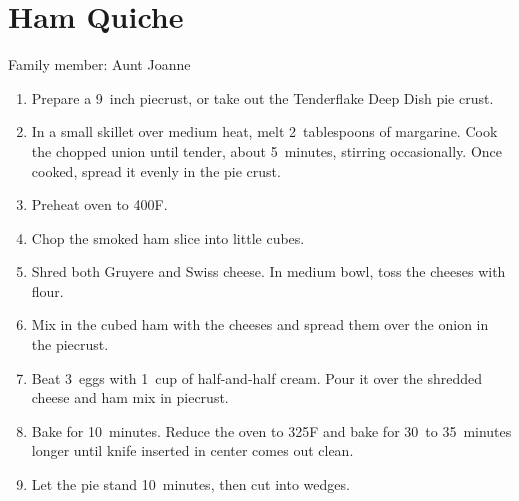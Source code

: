 \chapter{Ham Quiche}
\label{ch:hamquiche}


Family member: Aunt Joanne

\begin{enumerate}
    \item Prepare a 9~inch piecrust, or take out the Tenderflake Deep Dish pie crust.
    \item In a small skillet over medium heat, melt 2~tablespoons of margarine. Cook the chopped union until tender, about 5~minutes, stirring occasionally. Once cooked, spread it evenly in the pie crust.
    \item Preheat oven to 400\degree F.
    \item Chop the smoked ham slice into little cubes.
    \item Shred both Gruyere and Swiss cheese. In medium bowl, toss the cheeses with flour.
    \item Mix in the cubed ham with the cheeses and spread them over the onion in the piecrust.
    \item Beat 3~eggs with 1~cup of half-and-half cream. Pour it over the shredded cheese and ham mix in piecrust.
    \item Bake for 10~minutes. Reduce the oven to 325\degree F and bake for 30~to 35~minutes longer until knife inserted in center comes out clean.
    \item Let the pie stand 10~minutes, then cut into wedges.
\end{enumerate}
